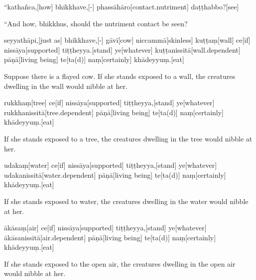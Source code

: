 \vskip 0.2in
\begin{samepage}
\begingl[glneveryline={\PaliGlossA,\PaliGlossB}]
“kathañca,[how] bhikkhave,[-] phassāhāro[contact.nutriment] daṭṭhabbo?[see]
\endgl
\nopagebreak
\linespread{0.5}
\begin{spacin}{0.2}
{\PaliGlossFT “And how, bhikkhus, should the nutriment contact be seen?}
\end{spacin}
\vskip 12pt
\end{samepage}
\begin{samepage}
\begingl[glneveryline={\PaliGlossA,\PaliGlossB}]
seyyathāpi,[just as] bhikkhave,[-] gāvī[cow] niccammā[skinless] kuṭṭaṃ[wall] ce[if] nissāya[supported] tiṭṭheyya.[stand] ye[whatever] kuṭṭanissitā[wall.dependent] pāṇā[living being] te[ta(d)] naṃ[certainly] khādeyyuṃ.[eat]
\endgl
\nopagebreak
\linespread{0.5}
\begin{spacin}{0.2}
{\PaliGlossFT Suppose there is a flayed cow. If she stands exposed to a wall, the creatures dwelling in the wall would nibble at her.}
\end{spacin}
\vskip 12pt
\end{samepage}
\begin{samepage}
\begingl[glneveryline={\PaliGlossA,\PaliGlossB}]
rukkhaṃ[tree] ce[if] nissāya[supported] tiṭṭheyya,[stand] ye[whatever] rukkhanissitā[tree.dependent] pāṇā[living being] te[ta(d)] naṃ[certainly] khādeyyuṃ.[eat]
\endgl
\nopagebreak
\linespread{0.5}
\begin{spacin}{0.2}
{\PaliGlossFT If she stands exposed to a tree, the creatures dwelling in the tree would nibble at her.}
\end{spacin}
\vskip 12pt
\end{samepage}
\begin{samepage}
\begingl[glneveryline={\PaliGlossA,\PaliGlossB}]
udakaṃ[water] ce[if] nissāya[supported] tiṭṭheyya,[stand] ye[whatever] udakanissitā[water.dependent] pāṇā[living being] te[ta(d)] naṃ[certainly] khādeyyuṃ.[eat]
\endgl
\nopagebreak
\linespread{0.5}
\begin{spacin}{0.2}
{\PaliGlossFT If she stands exposed to water, the creatures dwelling in the water would nibble at her.}
\end{spacin}
\vskip 12pt
\end{samepage}
\begin{samepage}
\begingl[glneveryline={\PaliGlossA,\PaliGlossB}]
ākāsaṃ[air] ce[if] nissāya[supported] tiṭṭheyya,[stand] ye[whatever] ākāsanissitā[air.dependent] pāṇā[living being] te[ta(d)] naṃ[certainly] khādeyyuṃ.[eat]
\endgl
\nopagebreak
\linespread{0.5}
\begin{spacin}{0.2}
{\PaliGlossFT If she stands exposed to the open air, the creatures dwelling in the open air would nibble at her.}
\end{spacin}
\vskip 12pt
\end{samepage}
